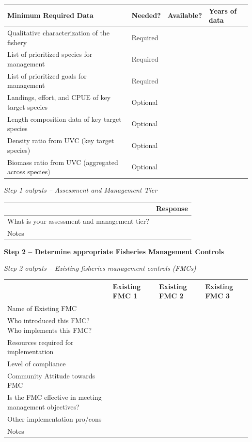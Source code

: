 \documentclass[]{book}
\begin{document}
\begin{tabular}{l|l|l|l}
\hline
Minimum Required Data & Needed? & Available? & Years of data\\
\hline
Qualitative characterization of the fishery & Required &  & \\
\hline
List of prioritized species for management & Required &  & \\
\hline
List of prioritized goals for management & Required &  & \\
\hline
Landings, effort, and CPUE of key target species & Optional &  & \\
\hline
Length composition data of key target species & Optional &  & \\
\hline
Density ratio from UVC (key target species) & Optional &  & \\
\hline
Biomass ratio from UVC (aggregated across species) & Optional &  & \\
\hline
\end{tabular}

\emph{Step 1 outputs -- Assessment and Management Tier}

\begin{tabular}{l|l}
\hline
  & Response\\
\hline
What is your assessment and management tier? & \\
\hline
Notes & \\
\hline
\end{tabular}

\textbf{Step 2 -- Determine appropriate Fisheries Management Controls}

\emph{Step 2 outputs -- Existing fisheries management controls (FMCs)}

\begin{tabular}{l|l|l|l}
\hline
  & Existing FMC 1 & Existing FMC 2 & Existing FMC 3\\
\hline
Name of Existing FMC &  &  & \\
\hline
Who introduced this FMC? Who implements this FMC? &  &  & \\
\hline
Resources required for implementation &  &  & \\
\hline
Level of compliance &  &  & \\
\hline
Community Attitude towards FMC &  &  & \\
\hline
Is the FMC effective in meeting management objectives? &  &  & \\
\hline
Other implementation pro/cons &  &  & \\
\hline
Notes &  &  & \\
\hline
\end{tabular}
\end{document}
